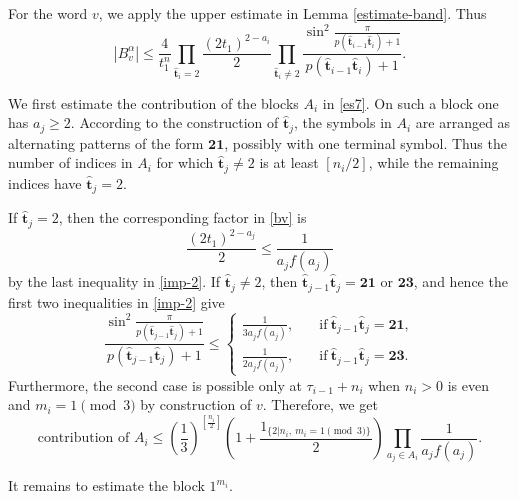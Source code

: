 \documentclass[reqno,11pt,graphicx,]{amsart}
\numberwithin{equation}{section}
\theoremstyle{plain}
\newcommand{\3}{\mathbf{3}}
\begin{document}
	
	For the word $v$, we apply the upper estimate in Lemma \ref{estimate-band}. Thus
	\begin{equation}\label{bv}
		|B_v^\alpha|\le\frac{4}{t_1^n}
		\prod_{\hat{\mathbf{t}}_i=2}\frac{(2t_1)^{2-a_i}}{2}
		\prod_{\hat{\mathbf{t}}_i\ne2}
		\frac{\sin^2\frac{\pi}{p(\hat{\mathbf{t}}_{i-1}\hat{\mathbf{t}}_i)+1}}
		{p(\hat{\mathbf{t}}_{i-1}\hat{\mathbf{t}}_i)+1}.
	\end{equation}
	
	
	We first estimate the contribution of the blocks $A_i$ in \eqref{es7}.  On such a block one has
	$a_j\ge 2$.  According to the construction of $\hat{\mathbf{t}}_j$, the symbols in $A_i$ are
	arranged as alternating patterns of the form $\mathbf{21}$, possibly with one terminal symbol. Thus the number of indices in $A_i$ for which $\hat{\mathbf{t}}_j\ne 2$ is at least
	$[ n_i/2]$, while the remaining indices have $\hat{\mathbf{t}}_j=2$.
	
	If $\hat{\mathbf{t}}_j=2$, then the corresponding factor in \eqref{bv} is
	\begin{equation*}
		\frac{(2t_1)^{2-a_j}}{2}\le \frac{1}{a_j f(a_j)}
	\end{equation*}
	by the last inequality in \eqref{imp-2}. 
	If $\hat{\mathbf{t}}_j\ne 2$, then $\hat{\mathbf{t}}_{j-1} \hat{\mathbf{t}}_j=\mathbf{2}\mathbf{1}$ or $\mathbf{2}\mathbf{3}$, and hence the first two inequalities in \eqref{imp-2} give
	\begin{equation*}
		\frac{\sin^2\frac{\pi}{p(\hat{\mathbf{t}}_{j-1} \hat{\mathbf{t}}_j)+1}}
		{p(\hat{\mathbf{t}}_{j-1} \hat{\mathbf{t}}_j)+1}\leq
		\begin{cases}
			\frac1{3a_jf(a_j)},\quad&\text{if}\ \hat{\mathbf{t}}_{j-1} \hat{\mathbf{t}}_j=\mathbf{2}\mathbf{1},\\
			\frac1{2a_jf(a_j)} ,\quad&\text{if}\ \hat{\mathbf{t}}_{j-1} \hat{\mathbf{t}}_j=\mathbf{2}\mathbf{3}.
		\end{cases}
	\end{equation*}
	Furthermore, the second case is possible only at $\tau_{i-1}+n_i$ when $n_i>0$ is even and $m_i=1\pmod 3$ by construction of $v$. Therefore, we get
	\begin{equation}
		\text{contribution of }A_i \le 
		\left(\frac1{3}\right)^{[\frac{n_i}{2}]}\left(1+\frac{1_{\{2|n_i,\ m_i=1\pmod3\}}}{2}\right)
		\prod_{a_j\in A_i}\frac{1}{a_j f(a_j)} . \label{es3}
	\end{equation}
	
	It remains to estimate the block $1^{m_i}$. 
	
\end{document}
